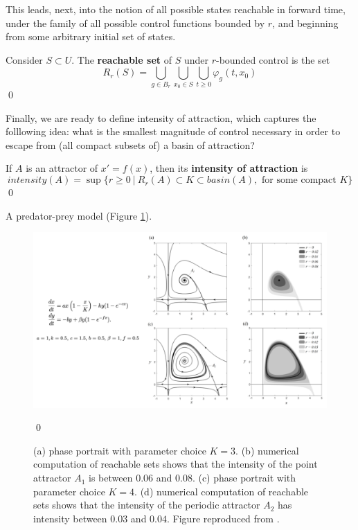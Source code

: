 This leads, next, into the notion of all possible states reachable in forward time, under the family of all possible control functions bounded by $r$, and beginning from some arbitrary initial set of states.  

\begin{definition}
	Consider $S\subset  U$. The \textbf{reachable set} of $S$ under $r$-bounded control is the set
	$$R_r(S) =  \bigcup\limits_{g \in B_r} \bigcup\limits_{x_0 \in S} \bigcup\limits_{t \geq 0}  \varphi_g(t,x_0)$$ \qed
\end{definition}

Finally, we are ready to define intensity of attraction, which captures the folllowing idea: what is the smallest magnitude of control necessary in order to escape from (all compact subsets of) a basin of attraction?

\begin{definition}
	If $A$ is an attractor of $x' = f(x)$, then its \textbf{intensity of attraction} is 
	$$intensity(A) = \sup\{ r \geq 0 ~|~ R_r(A) \subset K \subset basin(A), \text{ for some compact }K \}$$ \qed
\end{definition}
	
\begin{example}
A predator-prey model (Figure \ref{fig:predator_prey_reachable_sets}). 

\begin{figure}[H]
\centering
\captionsetup{width=0.9\linewidth}
\includegraphics[width=\textwidth]{figs/predator_prey_reachable_sets} 
\caption{
	(a) phase portrait with parameter choice $K = 3$. (b) numerical computation of reachable sets shows that the intensity of the point attractor $A_1$ is between $0.06$ and $0.08$. (c) phase portrait with parameter choice $K=4$. (d) numerical computation of reachable sets shows that the intensity of the periodic attractor $A_2$ has intensity between $0.03$ and $0.04$. Figure reproduced from \cite{meyerMetricPropertiesAttractors2019}.}\qed
\label{fig:predator_prey_reachable_sets}
\end{figure}
\end{example}

